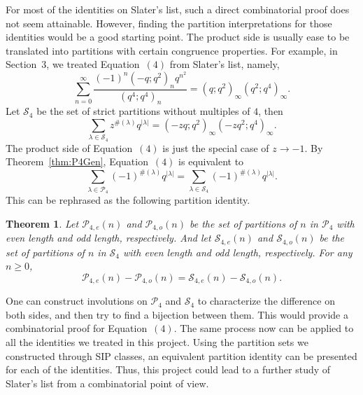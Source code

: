 \documentclass[12pt]{amsart}
\newtheorem{theorem}{Theorem}[section]
\theoremstyle{definition}
\theoremstyle{remark}
\numberwithin{equation}{section}
\begin{document}
For most of the identities on Slater's list, such a direct combinatorial proof does not seem attainable. However, finding the partition interpretations for those identities would be a good starting point. The product side is usually ease to be translated into partitions with certain congruence properties. For example, in Section~$3$, we treated Equation~$(4)$ from Slater's list, namely,
\begin{equation}
\sum_{n=0}^{\infty}\frac{(-1)^{n}(-q;q^2)_{n}q^{n^2}}{(q^4;q^4)_{n}}=(q;q^2)_{\infty}(q^2;q^4)_{\infty}. 
\end{equation}
Let $\mathcal{S}_4$ be the set of strict partitions without multiples of $4$, then
$$\sum_{\lambda\in\mathcal{S}_4}z^{\#(\lambda)}q^{|\lambda|}=(-zq;q^2)_{\infty}(-zq^2;q^4)_{\infty}.$$
The product side of Equation~$(4)$ is just the special case of $z\to-1$. By Theorem~\ref{thm:P4Gen}, Equation~$(4)$ is equivalent to
$$\sum_{\lambda\in\mathcal{P}_4}(-1)^{\#(\lambda)}q^{|\lambda|}=\sum_{\lambda\in\mathcal{S}_4}(-1)^{\#(\lambda)}q^{|\lambda|}.$$
This can be rephrased as the following partition identity.
\begin{theorem}
Let $\mathcal{P}_{4,e}(n)$ and $\mathcal{P}_{4,o}(n)$ be the set of partitions of $n$ in $\mathcal{P}_4$ with even length and odd length, respectively. And let $\mathcal{S}_{4,e}(n)$ and $\mathcal{S}_{4,o}(n)$ be the set of partitions of $n$ in $\mathcal{S}_4$ with even length and odd length, respectively. For any $n\geq0$,
$$\mathcal{P}_{4,e}(n)-\mathcal{P}_{4,o}(n)=\mathcal{S}_{4,e}(n)-\mathcal{S}_{4,o}(n).$$
\end{theorem}
One can construct involutions on $\mathcal{P}_4$ and $\mathcal{S}_4$ to characterize the difference on both sides, and then try to find a bijection between them. This would provide a combinatorial proof for Equation~$(4)$. The same process now can be applied to all the identities we treated in this project. Using the partition sets we constructed through SIP classes, an equivalent partition identity can be presented for each of the identities. Thus, this project could lead to a further study of Slater's list from a combinatorial point of view.\\
\end{document}

